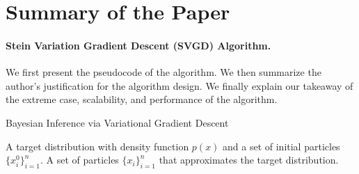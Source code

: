 \section{Summary of the Paper}

\paragraph{Stein Variation Gradient Descent (SVGD) Algorithm.} We first present the pseudocode of the algorithm. We then summarize the author's justification for the algorithm design. We finally explain our takeaway of the extreme case, scalability, and performance of the algorithm.


\begin{algorithm}[t!]
	\caption{Bayesian Inference via Variational Gradient Descent~\cite{ref_article_svgd}}
	\label{alg:svgd}
	\begin{algorithmic}
		 A target distribution with density function $p(x)$ and a set of initial particles $\{x_i^0\}_{i=1}^n$.
		 A set of particles $\{x_i\}_{i=1}^n$ that approximates the target distribution.
		\ENDFOR
	\end{algorithmic}
\end{algorithm}



